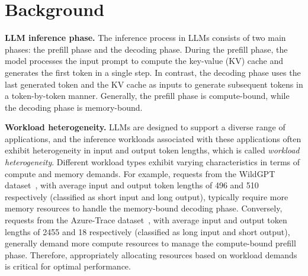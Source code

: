 \section{Background}
\label{sec:background}

\textbf{LLM inference phase.} The inference process in LLMs consists of two main phases: the prefill phase and the decoding phase. During the prefill phase, the model processes the input prompt to compute the key-value (KV) cache and generates the first token in a single step. In contrast, the decoding phase uses the last generated token and the KV cache as inputs to generate subsequent tokens in a token-by-token manner. Generally, the prefill phase is compute-bound, while the decoding phase is memory-bound.

\textbf{Workload heterogeneity.} LLMs are designed to support a diverse range of applications, and the inference workloads associated with these applications often exhibit heterogeneity in input and output token lengths, which is called \textit{workload heterogeneity}. Different workload types exhibit varying characteristics in terms of compute and memory demands. For example, requests from the WildGPT dataset~\cite{zhao2024wildchat}, with average input and output token lengths of 496 and 510 respectively (classified as short input and long output), typically require more memory resources to handle the memory-bound decoding phase. Conversely, requests from the Azure-Trace dataset~\cite{patel2024splitwise,azuredataset}, with average input and output token lengths of 2455 and 18 respectively (classified as long input and short output), generally demand more compute resources to manage the compute-bound prefill phase. Therefore, appropriately allocating resources based on workload demands is critical for optimal performance.



